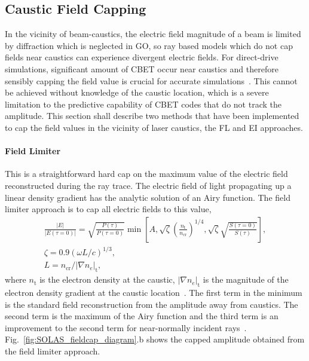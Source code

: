 \subsection{Caustic Field Capping}%
\label{sec:SOLAS_caustic_cap}
In the vicinity of beam-caustics, the electric field magnitude of a beam is limited by diffraction which is neglected in \ac{GO}, so ray based models which do not cap fields near caustics can experience divergent electric fields.
For direct-drive simulations, significant amount of \ac{CBET} occur near caustics and therefore sensibly capping the field value is crucial for accurate simulations~\cite{colaitis_adaptive_2019}.
This cannot be achieved without knowledge of the caustic location, which is a severe limitation to the predictive capability of \ac{CBET} codes that do not track the amplitude.
This section shall describe two methods that have been implemented to cap the field values in the vicinity of laser caustics, the \ac{FL} and \ac{EI} approaches.

\paragraph*{Field Limiter}
This is a straightforward hard cap on the maximum value of the electric field reconstructed during the ray trace.
The electric field of light propagating up a linear density gradient has the analytic solution of an Airy function.
The field limiter approach is to cap all electric fields to this value,
\begin{equation}
    \begin{gathered}
        \frac{|E|}{|E(\tau=0)|} = \sqrt{\frac{P(\tau)}{P(\tau=0)}} \min\left[ A, \sqrt{\zeta}\left( \frac{n_{\text{t}}}{n_{\text{cr}}} \right)^{1/4}, \sqrt{\zeta}\sqrt{\frac{S(\tau=0)}{S(\tau)}} \right], \\
        \zeta = 0.9\left( \omega L/c \right)^{1/3}, \\
        L = n_{\text{cr}}/|\nabla n_e|_\text{t},
    \end{gathered}
\end{equation}
where $n_{\text{t}}$ is the electron density at the caustic, $|\nabla n_e|_\text{t}$ is the magnitude of the electron density gradient at the caustic location~\cite{igumenshchev_crossed-beam_2012,follett_ray-based_2018,kruer_physics_2003}.
The first term in the minimum is the standard field reconstruction from the amplitude away from caustics.
The second term is the maximum of the Airy function and the third term is an improvement to the second term for near-normally incident rays~\cite{follett_validation_2022}.
Fig.~\ref{fig:SOLAS_fieldcap_diagram}.b shows the capped amplitude obtained from the field limiter approach.

